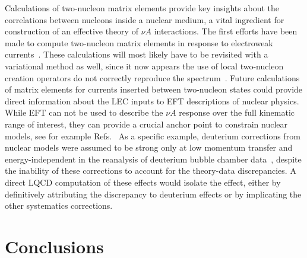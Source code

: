 \documentclass{ar-1col}
\begin{document}
Calculations of two-nucleon matrix elements provide key insights
 about the correlations between nucleons inside a nuclear medium,
 a vital ingredient for construction of an effective theory
 of $\nu A$ interactions.
The first efforts have been made to compute two-nucleon matrix elements in response to electroweak currents~\cite{Savage:2016kon,Chang:2017eiq}.
These calculations will most likely have to be revisited with a variational method as well,
 since it now appears the use of local two-nucleon creation operators do not correctly
 reproduce the spectrum~\cite{Francis:2018qch,Horz:2020zvv,Green:2021qol,Amarasinghe:2021lqa}.
Future calculations of matrix elements for currents inserted between
 two-nucleon states could provide direct information about the LEC inputs to EFT descriptions of nuclear physics.
While EFT can not be used to describe the $\nu A$ response over the full kinematic range of interest, they can provide a crucial anchor point to constrain nuclear models, see for example Refs.~\cite{Kronfeld:2019nfb,Drischler:2019xuo,Tews:2020hgp,Davoudi:2020ngi}
As a specific example, deuterium corrections from nuclear models were assumed to be strong only at low momentum transfer
 and energy-independent in the reanalysis of deuterium bubble chamber data~\cite{Meyer:2016oeg},
 despite the inability of these corrections to account for the theory-data discrepancies.
A direct LQCD computation of these effects would isolate the effect,
 either by definitively attributing the discrepancy to deuterium effects
 or by implicating the other systematics corrections.


\section{Conclusions\label{sec:conclusions}}
\end{document}
